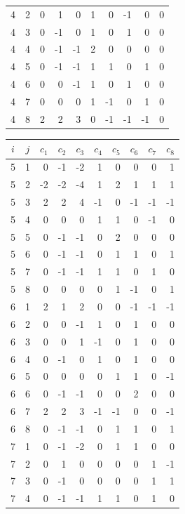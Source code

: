\documentclass[twoside,english]{paper}
\numberwithin{equation}{section}
\numberwithin{figure}{section}
\theoremstyle{definition}
\theoremstyle{remark}
\begin{document}
\begin{table}[H]
\begin{minipage}[t]{0.48\textwidth}
\begin{tabular}{cc|rrrrrrrr}
4 & 2 & 0 & 1 & 0 & 1 & 0 & -1 & 0 & 0 \\
4 & 3 & 0 & -1 & 0 & 1 & 0 & 1 & 0 & 0 \\
4 & 4 & 0 & -1 & -1 & 2 & 0 & 0 & 0 & 0 \\
4 & 5 & 0 & -1 & -1 & 1 & 1 & 0 & 1 & 0 \\
4 & 6 & 0 & 0 & -1 & 1 & 0 & 1 & 0 & 0 \\
4 & 7 & 0 & 0 & 0 & 1 & -1 & 0 & 1 & 0 \\
4 & 8 & 2 & 2 & 3 & 0 & -1 & -1 & -1 & 0 \\
\bottomrule
\end{tabular}
\end{minipage}\hfill
\begin{minipage}[t]{0.48\textwidth}
\centering
\begin{tabular}{cc|rrrrrrrr}
\toprule
$i$ & $j$ & $c_1$ & $c_2$ & $c_3$ & $c_4$ & $c_5$ & $c_6$ & $c_7$ & $c_8$ \\
\midrule
5 & 1 & 0 & -1 & -2 & 1 & 0 & 0 & 0 & 1 \\
5 & 2 & -2 & -2 & -4 & 1 & 2 & 1 & 1 & 1 \\
5 & 3 & 2 & 2 & 4 & -1 & 0 & -1 & -1 & -1 \\
5 & 4 & 0 & 0 & 0 & 1 & 1 & 0 & -1 & 0 \\
5 & 5 & 0 & -1 & -1 & 0 & 2 & 0 & 0 & 0 \\
5 & 6 & 0 & -1 & -1 & 0 & 1 & 1 & 0 & 1 \\
5 & 7 & 0 & -1 & -1 & 1 & 1 & 0 & 1 & 0 \\
5 & 8 & 0 & 0 & 0 & 0 & 1 & -1 & 0 & 1 \\
\midrule
6 & 1 & 2 & 1 & 2 & 0 & 0 & -1 & -1 & -1 \\
6 & 2 & 0 & 0 & -1 & 1 & 0 & 1 & 0 & 0 \\
6 & 3 & 0 & 0 & 1 & -1 & 0 & 1 & 0 & 0 \\
6 & 4 & 0 & -1 & 0 & 1 & 0 & 1 & 0 & 0 \\
6 & 5 & 0 & 0 & 0 & 0 & 1 & 1 & 0 & -1 \\
6 & 6 & 0 & -1 & -1 & 0 & 0 & 2 & 0 & 0 \\
6 & 7 & 2 & 2 & 3 & -1 & -1 & 0 & 0 & -1 \\
6 & 8 & 0 & -1 & -1 & 0 & 1 & 1 & 0 & 1 \\
\midrule
7 & 1 & 0 & -1 & -2 & 0 & 1 & 1 & 0 & 0 \\
7 & 2 & 0 & 1 & 0 & 0 & 0 & 0 & 1 & -1 \\
7 & 3 & 0 & -1 & 0 & 0 & 0 & 0 & 1 & 1 \\
7 & 4 & 0 & -1 & -1 & 1 & 1 & 0 & 1 & 0 \\

\end{tabular}
\end{minipage}
\end{table}
\end{document}

